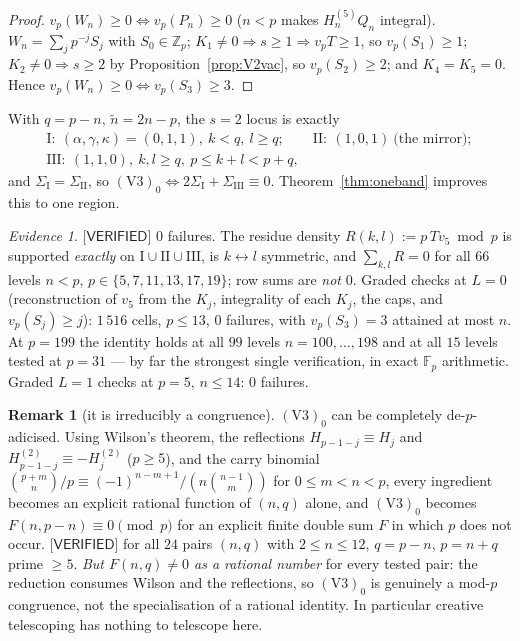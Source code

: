 \documentclass[11pt,reqno]{amsart}
\theoremstyle{plain}
\theoremstyle{definition}
\newtheorem{remark}[theorem]{Remark}
\theoremstyle{remark}
\newtheorem{evidence}[theorem]{Evidence}
\numberwithin{equation}{section}
\newcommand{\ZZ}{\mathbb{Z}}
\newcommand{\FF}{\mathbb{F}}
\newcommand{\Zp}{\ZZ_p}
\newcommand{\vfive}{v_5}
\newcommand{\VERIFIED}{\textsf{[VERIFIED]}}
\begin{document}
\begin{proof}
$v_p(W_n)\ge0\iff v_p(P_n)\ge0$ ($n<p$ makes $H^{(5)}_nQ_n$ integral). $W_n=\sum_jp^{-j}S_j$
with $S_0\in\Zp$; $K_1\ne0\Rightarrow s\ge1\Rightarrow v_pT\ge1$, so $v_p(S_1)\ge1$;
$K_2\ne0\Rightarrow s\ge2$ by Proposition~\ref{prop:V2vac}, so $v_p(S_2)\ge2$; and
$K_4=K_5=0$. Hence $v_p(W_n)\ge0\iff v_p(S_3)\ge3$.
\end{proof}

With $q=p-n$, $\tilde n=2n-p$, the $s=2$ locus is exactly
\[
\begin{gathered}
\mathrm I:\ (\alpha,\gamma,\kappa)=(0,1,1),\ k<q,\ l\ge q;\qquad
\mathrm{II}:\ (1,0,1)\ \text{(the mirror)};\\
\mathrm{III}:\ (1,1,0),\ k,l\ge q,\ p\le k+l<p+q,
\end{gathered}
\]
and $\Sigma_{\mathrm I}=\Sigma_{\mathrm{II}}$, so $(\mathrm V3)_0\iff
2\Sigma_{\mathrm I}+\Sigma_{\mathrm{III}}\equiv0$. Theorem~\ref{thm:oneband} improves this to
one region.

\begin{evidence}\label{ev:V3}
$\VERIFIED$ $0$ failures. The residue density $R(k,l):=p\,T\vfive\bmod p$ is supported
\emph{exactly} on $\mathrm I\cup\mathrm{II}\cup\mathrm{III}$, is $k\leftrightarrow l$ symmetric,
and $\sum_{k,l}R=0$ for all $66$ levels $n<p$, $p\in\{5,7,11,13,17,19\}$; row sums are
\emph{not} $0$. Graded checks at $L=0$ (reconstruction of $\vfive$ from the $K_j$, integrality
of each $K_j$, the caps, and $v_p(S_j)\ge j$): $1\,516$ cells, $p\le13$, $0$ failures, with
$v_p(S_3)=3$ attained at most $n$. At $p=199$ the identity holds at all $99$ levels
$n=100,\dots,198$ and at all $15$ levels tested at $p=31$ --- by far the strongest single
verification, in exact $\FF_p$ arithmetic. Graded $L=1$ checks at $p=5$, $n\le14$: $0$
failures.
\end{evidence}

\begin{remark}[it is irreducibly a congruence]
$(\mathrm V3)_0$ can be completely de-$p$-adicised. Using Wilson's theorem, the reflections
$H_{p-1-j}\equiv H_j$ and $H^{(2)}_{p-1-j}\equiv-H^{(2)}_j$ ($p\ge5$), and the carry binomial
$\binom{p+m}{n}/p\equiv(-1)^{n-m+1}/(n\binom{n-1}{m})$ for $0\le m<n<p$, every ingredient
becomes an explicit rational function of $(n,q)$ alone, and $(\mathrm V3)_0$ becomes
$F(n,p-n)\equiv0\pmod p$ for an explicit finite double sum $F$ in which $p$ does not occur.
$\VERIFIED$ for all $24$ pairs $(n,q)$ with $2\le n\le12$, $q=p-n$, $p=n+q$ prime $\ge5$.
\emph{But $F(n,q)\ne0$ as a rational number} for every tested pair: the reduction consumes
Wilson and the reflections, so $(\mathrm V3)_0$ is genuinely a mod-$p$ congruence, not the
specialisation of a rational identity. In particular creative telescoping has nothing to
telescope here.
\end{remark}
\end{document}
